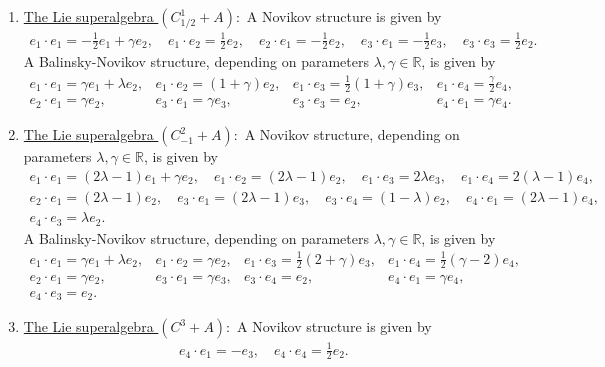 \documentclass[12pt]{amsart}
\begin{document}
\begin{enumerate}
\[\begin{array}{llll}
 \end{array}
 \]
   \item \underline{The Lie superalgebra $(C_{1/2}^1+A):$} A Novikov structure is given by 
    \[
\begin{array}{l}
e_1\cdot e_1= -\frac{1}{2} e_1 +\gamma e_2 , \quad e_1\cdot e_2= \frac{1}{2} e_2, \quad e_2\cdot e_1= -\frac{1}{2} e_2, \quad e_3\cdot e_1=-\frac{1}{2} e_3,\quad  e_3\cdot e_3=\frac{1}{2}e_2.
\end{array}
 \]
A Balinsky-Novikov structure, depending on parameters $\lambda, \gamma \in \mathbb R$, is given by
 \[
 \begin{array}{llll}
e_1 \cdot e_1= \gamma e_1 + \lambda e_2, & e_1 \cdot e_2= (1+\gamma) e_2, & 
e_1 \cdot e_3=\frac{1}{2}(1+\gamma) e_3,&
e_1 \cdot e_4=\frac{\gamma}{2}e_4,\\[2mm]
e_2\cdot e_1= \gamma e_2, & e_3\cdot e_1=\gamma e_3, & e_3\cdot e_3= e_2, & e_4\cdot e_1=\gamma e_4.
 \end{array}
 \]
  \item \underline{The Lie superalgebra $(C_{-1}^2+A):$} A Novikov structure, depending on parameters $\lambda, \gamma \in \mathbb R$, is given by
    \[
\begin{array}{l}
e_1\cdot e_1= (2\lambda-1) e_1 +\gamma e_2 , \quad e_1\cdot e_2= (2\lambda-1) e_2, \quad e_1\cdot e_3= 2 \lambda  e_3, \quad e_1\cdot e_4=2(\lambda-1) e_4,\\[2mm]
e_2\cdot e_1=(2\lambda -1)e_2, \quad e_3\cdot e_1=(2 \lambda -1) e_3, \quad e_3 \cdot e_4=(1-\lambda) e_2, \quad e_4\cdot e_1=(2\lambda -1) e_4, \\[2mm] 
e_4\cdot e_3=\lambda e_2.
\end{array}
 \]
A Balinsky-Novikov structure, depending on parameters $\lambda, \gamma \in \mathbb R$, is given by
 \[
 \begin{array}{llll}
e_1 \cdot e_1= \gamma e_1 + \lambda e_2, & e_1 \cdot e_2= \gamma e_2, & 
e_1 \cdot e_3=\frac{1}{2}(2+\gamma) e_3,&
e_1 \cdot e_4=\frac{1}{2} (\gamma -2)e_4,\\[2mm]
e_2\cdot e_1= \gamma e_2, & e_3\cdot e_1=\gamma e_3, & e_3\cdot e_4= e_2, & e_4\cdot e_1=\gamma e_4,\\[2mm]
e_4\cdot e_3=e_2.
 \end{array}
 \]
 \item \underline{The Lie superalgebra $(C^3+A):$} A Novikov structure is given by
    \[
    \begin{array}{c}
e_4 \cdot e_1=- e_3, \quad e_4\cdot e_4=\frac{1}{2}e_2.
\end{array}
\]
\end{enumerate}
\end{document}
